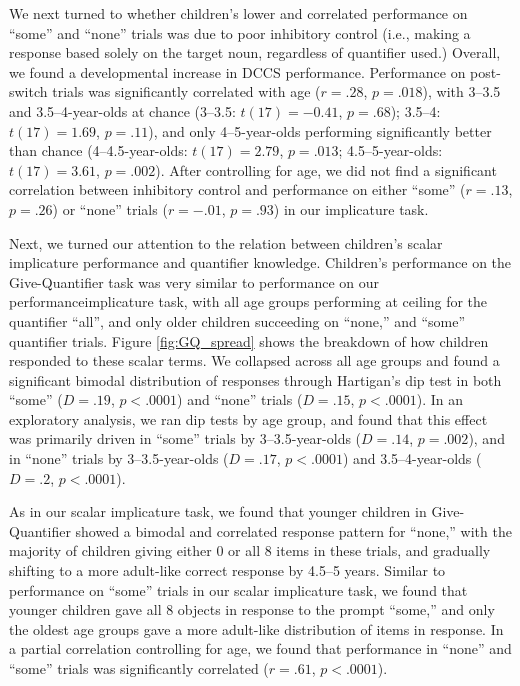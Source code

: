 \documentclass[man]{apa2}
\begin{document}
We next turned to whether children's lower and correlated performance on ``some'' and ``none'' trials was due to poor inhibitory control (i.e., making a response based solely on the target noun, regardless of quantifier used.) Overall, we found a developmental increase in DCCS performance. Performance on post-switch trials was significantly correlated with age ($r = .28$, $p = .018$), with 3--3.5 and 3.5--4-year-olds at chance (3--3.5: $t(17) = -0.41$, $p = .68$); 3.5--4: $t(17) = 1.69$, $p = .11$), and only 4--5-year-olds performing significantly better than chance (4--4.5-year-olds: $t(17) = 2.79$, $p = .013$; 4.5--5-year-olds: $t(17) = 3.61$, $p = .002$). After controlling for age, we did not find a significant correlation between inhibitory control and performance on either ``some'' ($r = .13$, $p = .26$) or ``none'' trials ($r = - .01$, $p = .93$) in our implicature task.

Next, we turned our attention to the relation between children's scalar implicature performance and quantifier knowledge. Children's performance on the Give-Quantifier task was very similar to performance on our performanceimplicature task, with all age groups performing at ceiling for the quantifier ``all'', and only older children succeeding on ``none,'' and ``some'' quantifier trials. Figure \ref{fig:GQ_spread} shows the breakdown of how children responded to these scalar terms. We collapsed across all age groups and found a significant bimodal distribution of responses through Hartigan's dip test in both ``some'' ($D = .19$, $p < .0001$) and ``none'' trials ($D = .15$, $p < .0001$). In an exploratory analysis, we ran dip tests by age group, and found that this effect was primarily driven in ``some'' trials by 3--3.5-year-olds ($D = .14$, $p = .002$), and in ``none'' trials by 3--3.5-year-olds ($D = .17$, $p < .0001$) and 3.5--4-year-olds ($D = .2$, $p < .0001$).

As in our scalar implicature task, we found that younger children in Give-Quantifier showed a bimodal and correlated response pattern for ``none,'' with the majority of children giving either 0 or all 8 items in these trials, and gradually shifting to a more adult-like correct response by 4.5--5 years. Similar to performance on ``some'' trials in our scalar implicature task, we found that younger children gave all 8 objects in response to the prompt ``some,'' and only the oldest age groups gave a more adult-like distribution of items in response. In a partial correlation controlling for age, we found that performance in ``none'' and ``some'' trials was significantly correlated ($r = .61$, $p < .0001$).
\end{document}
